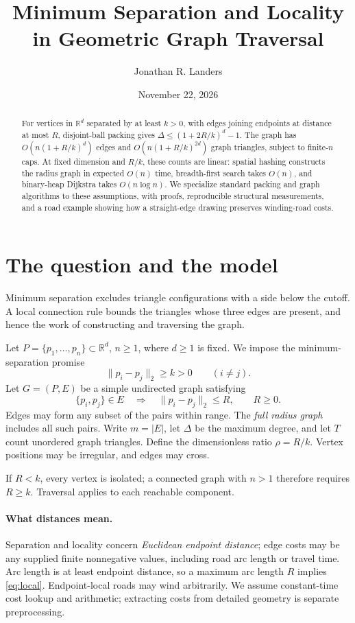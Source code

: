 \documentclass[11pt]{article}
\title{Minimum Separation and Locality\\in Geometric Graph Traversal}
\author{Jonathan R. Landers}
\date{November 22, 2026}
\newcommand{\R}{\mathbb R}
\begin{document}
\maketitle
\begin{abstract}
For vertices in $\R^d$ separated by at least $k>0$, with edges joining
endpoints at distance at most $R$, disjoint-ball packing gives
$\Delta\le(1+2R/k)^d-1$. The graph has $O(n(1+R/k)^d)$ edges and
$O(n(1+R/k)^{2d})$ graph triangles, subject to finite-$n$ caps.
At fixed dimension and $R/k$, these counts are linear: spatial hashing
constructs the radius graph in expected $O(n)$ time, breadth-first search
takes $O(n)$, and binary-heap Dijkstra takes $O(n\log n)$.
We specialize standard packing and graph algorithms to these assumptions,
with proofs, reproducible structural measurements, and a road example
showing how a straight-edge drawing preserves winding-road costs.
\end{abstract}

\section{The question and the model}
Minimum separation excludes triangle configurations with a side below
the cutoff. A local connection rule bounds the triangles whose three
edges are present, and hence the work of constructing and traversing the graph.

Let $P=\{p_1,\ldots,p_n\}\subset\R^d$, $n\ge1$, where $d\ge1$ is fixed.
We impose the minimum-separation promise
\begin{equation}\label{eq:sep}
 \|p_i-p_j\|_2\ge k>0\qquad(i\ne j).
\end{equation}
Let $G=(P,E)$ be a simple undirected graph satisfying
\begin{equation}\label{eq:local}
 \{p_i,p_j\}\in E\quad\Longrightarrow\quad \|p_i-p_j\|_2\le R,
 \qquad R\ge0.
\end{equation}
Edges may form any subset of the pairs within range. The \emph{full radius
graph} includes all such pairs. Write $m=|E|$, let $\Delta$ be the maximum
degree, and let $T$ count unordered graph triangles. Define the dimensionless
ratio $\rho=R/k$. Vertex positions may be irregular, and edges may cross.

If $R<k$, every vertex is isolated; a connected graph with $n>1$ therefore
requires $R\ge k$. Traversal applies to each reachable component.

\paragraph{What distances mean.}
Separation and locality concern \emph{Euclidean endpoint distance}; edge
costs may be any supplied finite nonnegative values, including road arc
length or travel time. Arc length is at least endpoint distance, so a
maximum arc length $R$ implies \eqref{eq:local}. Endpoint-local roads may
wind arbitrarily. We assume constant-time cost lookup and arithmetic;
extracting costs from detailed geometry is separate preprocessing.
\end{document}
